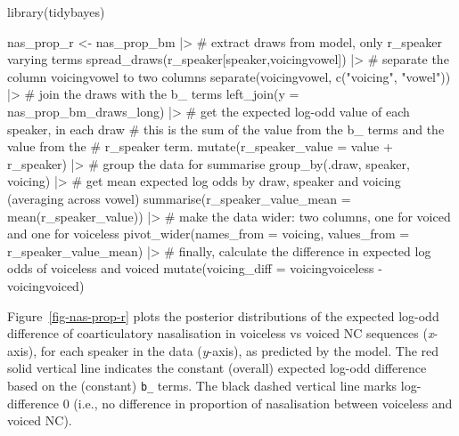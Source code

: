 \documentclass[
  authoryear,
  preprint,
  3p]{elsarticle}
\newenvironment{Shaded}{\begin{snugshade}}{\end{snugshade}}
\newcommand{\AttributeTok}[1]{\textcolor[rgb]{0.40,0.45,0.13}{#1}}
\newcommand{\CommentTok}[1]{\textcolor[rgb]{0.37,0.37,0.37}{#1}}
\newcommand{\FunctionTok}[1]{\textcolor[rgb]{0.28,0.35,0.67}{#1}}
\newcommand{\NormalTok}[1]{\textcolor[rgb]{0.00,0.23,0.31}{#1}}
\newcommand{\OtherTok}[1]{\textcolor[rgb]{0.00,0.23,0.31}{#1}}
\newcommand{\SpecialCharTok}[1]{\textcolor[rgb]{0.37,0.37,0.37}{#1}}
\newcommand{\StringTok}[1]{\textcolor[rgb]{0.13,0.47,0.30}{#1}}
\begin{document}
\begin{Shaded}
\begin{Highlighting}[]
\FunctionTok{library}\NormalTok{(tidybayes)}

\NormalTok{nas\_prop\_r }\OtherTok{\textless{}{-}}\NormalTok{ nas\_prop\_bm }\SpecialCharTok{|\textgreater{}} 
  \CommentTok{\# extract draws from model, only \textasciigrave{}r\_speaker\textasciigrave{} varying terms}
  \FunctionTok{spread\_draws}\NormalTok{(r\_speaker[speaker,voicingvowel]) }\SpecialCharTok{|\textgreater{}} 
  \CommentTok{\# separate the column voicingvowel to two columns}
  \FunctionTok{separate}\NormalTok{(voicingvowel, }\FunctionTok{c}\NormalTok{(}\StringTok{"voicing"}\NormalTok{, }\StringTok{"vowel"}\NormalTok{)) }\SpecialCharTok{|\textgreater{}} 
  \CommentTok{\# join the draws with the \textasciigrave{}b\_\textasciigrave{} terms}
  \FunctionTok{left\_join}\NormalTok{(}\AttributeTok{y =}\NormalTok{ nas\_prop\_bm\_draws\_long) }\SpecialCharTok{|\textgreater{}} 
  \CommentTok{\# get the expected log{-}odd value of each speaker, in each draw}
  \CommentTok{\# this is the sum of the \textasciigrave{}value\textasciigrave{} from the b\_ terms and the value from the}
  \CommentTok{\# r\_speaker term.}
  \FunctionTok{mutate}\NormalTok{(}\AttributeTok{r\_speaker\_value =}\NormalTok{ value }\SpecialCharTok{+}\NormalTok{ r\_speaker) }\SpecialCharTok{|\textgreater{}} 
  \CommentTok{\# group the data for summarise}
  \FunctionTok{group\_by}\NormalTok{(.draw, speaker, voicing) }\SpecialCharTok{|\textgreater{}} 
  \CommentTok{\# get mean expected log odds by draw, speaker and voicing (averaging across vowel)}
  \FunctionTok{summarise}\NormalTok{(}\AttributeTok{r\_speaker\_value\_mean =} \FunctionTok{mean}\NormalTok{(r\_speaker\_value)) }\SpecialCharTok{|\textgreater{}} 
  \CommentTok{\# make the data wider: two columns, one for voiced and one for voiceless}
  \FunctionTok{pivot\_wider}\NormalTok{(}\AttributeTok{names\_from =}\NormalTok{ voicing, }\AttributeTok{values\_from =}\NormalTok{ r\_speaker\_value\_mean) }\SpecialCharTok{|\textgreater{}} 
  \CommentTok{\# finally, calculate the difference in expected log odds of voiceless and voiced}
  \FunctionTok{mutate}\NormalTok{(}\AttributeTok{voicing\_diff =}\NormalTok{ voicingvoiceless }\SpecialCharTok{{-}}\NormalTok{ voicingvoiced)}
\end{Highlighting}
\end{Shaded}

Figure~\ref{fig-nas-prop-r} plots the posterior distributions of the
expected log-odd difference of coarticulatory nasalisation in voiceless
vs voiced NC sequences (\emph{x}-axis), for each speaker in the data
(\emph{y}-axis), as predicted by the model. The red solid vertical line
indicates the constant (overall) expected log-odd difference based on
the (constant) \texttt{b\_} terms. The black dashed vertical line marks
log-difference 0 (i.e., no difference in proportion of nasalisation
between voiceless and voiced NC).
\end{document}
